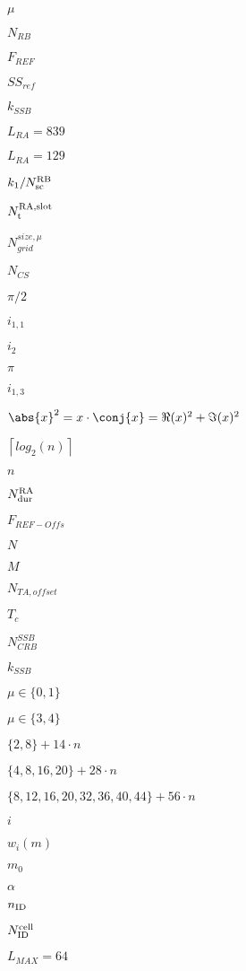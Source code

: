 \documentclass{article}
\begin{document}
$\mu$
\pagebreak

$N_{RB}$
\pagebreak

$F_{REF}$
\pagebreak

$SS_{ref}$
\pagebreak

$k_{SSB}$
\pagebreak

$L_{RA}=839$
\pagebreak

$L_{RA}=129$
\pagebreak

$k_1/N_{\textup{sc}}^{\textup{RB}}$
\pagebreak

$N_\textup{t}^\textup{RA,slot}$
\pagebreak

$N_{grid}^{size,\mu}$
\pagebreak

$N_{CS}$
\pagebreak

$\pi/2$
\pagebreak

$i_{1,1}$
\pagebreak

$i_2$
\pagebreak

$\pi$
\pagebreak

$i_{1,3}$
\pagebreak

$\abs{x}^2=x\cdot\conj{x}=\Re(x)^2+\Im(x)^2$
\pagebreak

$\left \lceil log_2(n) \right \rceil$
\pagebreak

$n$
\pagebreak

$N_\textup{dur}^\textup{RA}$
\pagebreak

$F_{REF-Offs}$
\pagebreak

$N$
\pagebreak

$M$
\pagebreak

$N_{TA,offset}$
\pagebreak

$T_c$
\pagebreak

$N_{CRB}^{SSB}$
\pagebreak

$ k_{SSB} $
\pagebreak

$\mu\in\{0,1\}$
\pagebreak

$\mu\in\{3,4\}$
\pagebreak

$\{2, 8\} + 14\cdot n$
\pagebreak

$\{4, 8, 16, 20\} + 28\cdot n$
\pagebreak

$\{8, 12, 16, 20, 32, 36, 40, 44 \} + 56\cdot n$
\pagebreak

$i$
\pagebreak

$w_i(m)$
\pagebreak

$m_0$
\pagebreak

$\alpha$
\pagebreak

$n_{\textup{ID}}$
\pagebreak

$N_{\textup{ID}}^{\textup{cell}}$
\pagebreak

$L_{MAX} = 64$
\pagebreak
\end{document}
